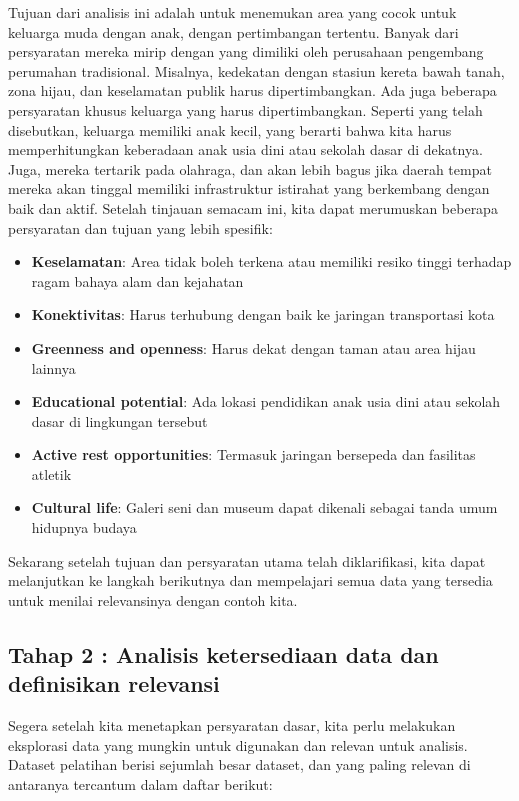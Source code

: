 \documentclass[]{book}
\begin{document}
Tujuan dari analisis ini adalah untuk menemukan area yang cocok untuk keluarga muda dengan anak, dengan pertimbangan tertentu. Banyak dari persyaratan mereka mirip dengan yang dimiliki oleh perusahaan pengembang perumahan tradisional. Misalnya, kedekatan dengan stasiun kereta bawah tanah, zona hijau, dan keselamatan publik harus dipertimbangkan. Ada juga beberapa persyaratan khusus keluarga yang harus dipertimbangkan. Seperti yang telah disebutkan, keluarga memiliki anak kecil, yang berarti bahwa kita harus memperhitungkan keberadaan anak usia dini atau sekolah dasar di dekatnya. Juga, mereka tertarik pada olahraga, dan akan lebih bagus jika daerah tempat mereka akan tinggal memiliki infrastruktur istirahat yang berkembang dengan baik dan aktif. Setelah tinjauan semacam ini, kita dapat merumuskan beberapa persyaratan dan tujuan yang lebih spesifik:

\begin{itemize}
\item
  \textbf{Keselamatan}: Area tidak boleh terkena atau memiliki resiko tinggi terhadap ragam bahaya alam dan kejahatan
\item
  \textbf{Konektivitas}: Harus terhubung dengan baik ke jaringan transportasi kota
\item
  \textbf{Greenness and openness}: Harus dekat dengan taman atau area hijau lainnya
\item
  \textbf{Educational potential}: Ada lokasi pendidikan anak usia dini atau sekolah dasar di lingkungan tersebut
\item
  \textbf{Active rest opportunities}: Termasuk jaringan bersepeda dan fasilitas atletik
\item
  \textbf{Cultural life}: Galeri seni dan museum dapat dikenali sebagai tanda umum hidupnya budaya
\end{itemize}

Sekarang setelah tujuan dan persyaratan utama telah diklarifikasi, kita dapat melanjutkan ke langkah berikutnya dan mempelajari semua data yang tersedia untuk menilai relevansinya dengan contoh kita.

\hypertarget{tahap-2-analisis-ketersediaan-data-dan-definisikan-relevansi}{%
\subsection{Tahap 2 : Analisis ketersediaan data dan definisikan relevansi}\label{tahap-2-analisis-ketersediaan-data-dan-definisikan-relevansi}}

Segera setelah kita menetapkan persyaratan dasar, kita perlu melakukan eksplorasi data yang mungkin untuk digunakan dan relevan untuk analisis. Dataset pelatihan berisi sejumlah besar dataset, dan yang paling relevan di antaranya tercantum dalam daftar berikut:
\end{document}
